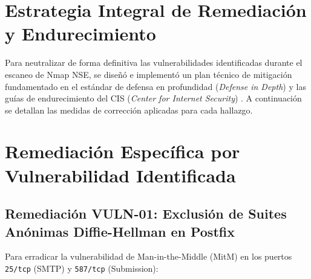 
\section{Estrategia Integral de Remediación y Endurecimiento}

Para neutralizar de forma definitiva las vulnerabilidades identificadas durante el escaneo de Nmap NSE, se diseñó e implementó un plan técnico de mitigación fundamentado en el estándar de defensa en profundidad (\textit{Defense in Depth}) y las guías de endurecimiento del CIS (\textit{Center for Internet Security}) \citep{cis_debian_2023}. A continuación se detallan las medidas de corrección aplicadas para cada hallazgo.

\section{Remediación Específica por Vulnerabilidad Identificada}

\subsection{Remediación VULN-01: Exclusión de Suites Anónimas Diffie-Hellman en Postfix}

Para erradicar la vulnerabilidad de Man-in-the-Middle (MitM) en los puertos \texttt{25/tcp} (SMTP) y \texttt{587/tcp} (Submission):

